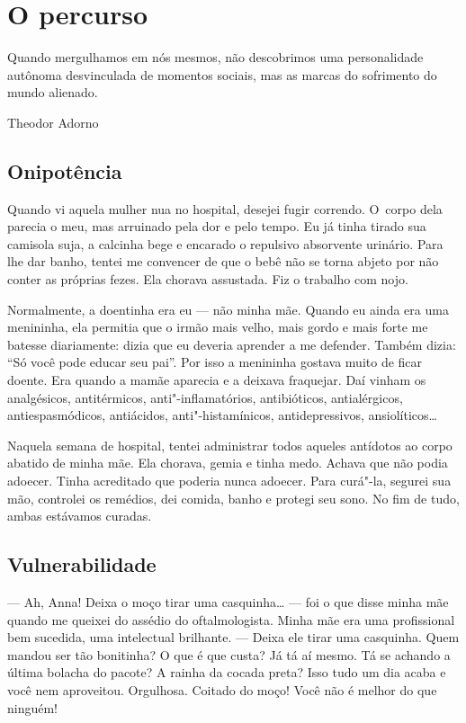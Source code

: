\part{O percurso} 

\lonelyepigraph{} 

\epigraph{Quando mergulhamos em nós mesmos, não descobrimos uma personalidade
autônoma desvinculada de momentos sociais, mas as marcas do sofrimento
do mundo alienado.}{Theodor Adorno} 

\chapter{Onipotência}

Quando vi aquela mulher nua no hospital, desejei fugir correndo. O~corpo
dela parecia o meu, mas arruinado pela dor e pelo tempo. Eu já tinha
tirado sua camisola suja, a calcinha bege e encarado o repulsivo
absorvente urinário. Para lhe dar banho, tentei me convencer de que o
bebê não se torna abjeto por não conter as próprias fezes. Ela chorava
assustada. Fiz o trabalho com nojo.

Normalmente, a doentinha era eu --- não minha mãe. Quando eu ainda era
uma menininha, ela permitia que o irmão mais velho, mais gordo e mais
forte me batesse diariamente: dizia que eu deveria aprender a me
defender. Também dizia: ``Só você pode educar seu pai''. Por isso a
menininha gostava muito de ficar doente. Era quando a mamãe aparecia e a
deixava fraquejar. Daí vinham os analgésicos, antitérmicos,
anti"-inflamatórios, antibióticos, antialérgicos, antiespasmódicos,
antiácidos, anti"-histamínicos, antidepressivos, ansiolíticos…

Naquela semana de hospital, tentei administrar todos aqueles antídotos
ao corpo abatido de minha mãe. Ela chorava, gemia e tinha medo. Achava
que não podia adoecer. Tinha acreditado que poderia nunca adoecer. Para
curá"-la, segurei sua mão, controlei os remédios, dei comida, banho e
protegi seu sono. No fim de tudo, ambas estávamos curadas.

\chapter{Vulnerabilidade}

\mbox{}\indent{}--- Ah, Anna! Deixa o moço tirar uma casquinha… --- foi o que
disse minha mãe quando me queixei do assédio do oftalmologista. Minha
mãe era uma profissional bem sucedida, uma intelectual brilhante. ---
Deixa ele tirar uma casquinha. Quem mandou ser tão bonitinha? O que é
que custa? Já tá aí mesmo. Tá se achando a última bolacha do pacote? A
rainha da cocada preta? Isso tudo um dia acaba e você nem aproveitou.
Orgulhosa. Coitado do moço! Você não é melhor do que ninguém!

